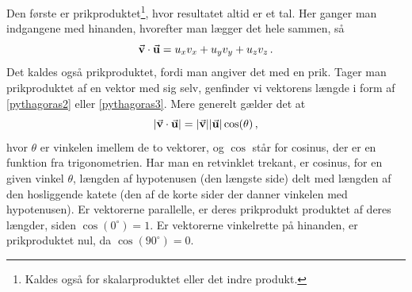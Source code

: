 Den første er prikproduktet\footnote{Kaldes også for skalarproduktet eller det indre produkt.}, hvor resultatet altid er et tal.
Her ganger man indgangene med hinanden, hvorefter man lægger det hele sammen, så
\begin{equation}\label{mat:prikprodukt}
    \va v\cdot \va u=u_xv_x+u_yv_y+u_zv_z \, .
\end{equation}
Det kaldes også prikproduktet, fordi man angiver det med en prik.
Tager man prikproduktet af en vektor med sig selv, genfinder vi vektorens længde i form af \eqref{pythagoras2} eller \eqref{pythagoras3}.
Mere generelt gælder det at
\begin{equation}
    \abs{\va v\cdot \va u}=\abs{\va v}\abs{\va u}\cos(\theta) \, ,
\end{equation}
hvor $\theta$ er vinkelen imellem de to vektorer, og
$\cos$ står for cosinus, der er en funktion fra trigonometrien.
Har man en retvinklet trekant, er cosinus, for en given vinkel $\theta$, længden af hypotenusen (den længste side) delt med længden af den hosliggende katete (den af de korte sider der danner vinkelen med hypotenusen).
Er vektorerne parallelle, er deres prikprodukt produktet af deres længder, siden $\cos(0^\circ)=1$.
Er vektorerne vinkelrette på hinanden, er prikproduktet nul, da $\cos(90^\circ)=0$.


